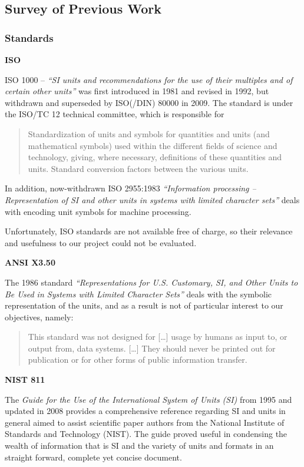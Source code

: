\subsection{Survey of Previous Work}\label{survey-of-previous-work}

\subsubsection{Standards}\label{standards}

\textbf{ISO}

ISO 1000 -- \emph{``SI units and recommendations for the use of their
multiples and of certain other units''} was first introduced in 1981 and
revised in 1992, but withdrawn and superseded by ISO(/DIN) 80000 in
2009. The standard is under the ISO/TC 12 technical committee, which is
responsible for

\begin{quote}
Standardization of units and symbols for quantities and units (and
mathematical symbols) used within the different fields of science and
technology, giving, where necessary, definitions of these quantities and
units. Standard conversion factors between the various units.
\end{quote}

In addition, now-withdrawn ISO 2955:1983 \emph{``Information processing
-- Representation of SI and other units in systems with limited
character sets''} deals with encoding unit symbols for machine
processing.

Unfortunately, ISO standards are not available free of charge, so their
relevance and usefulness to our project could not be evaluated.

\textbf{ANSI X3.50}

The 1986 standard \emph{``Representations for U.S. Customary, SI, and
Other Units to Be Used in Systems with Limited Character Sets''} deals
with the symbolic representation of the units, and as a result is not of
particular interest to our objectives, namely:

\begin{quote}
This standard was not designed for {[}\ldots{}{]} usage by humans as
input to, or output from, data systems. {[}\ldots{}{]} They should never
be printed out for publication or for other forms of public information
transfer.
\end{quote}

\textbf{NIST 811}

The \emph{Guide for the Use of the International System of Units (SI)}
from 1995 and updated in 2008 provides a comprehensive reference
regarding SI and units in general aimed to assist scientific paper
authors from the National Institute of Standards and Technology (NIST).
The guide proved useful in condensing the wealth of information that is
SI and the variety of units and formats in an straight forward, complete
yet concise document.

